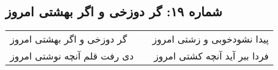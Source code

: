 \begin{center}
\section*{شماره ۱۹: گر دوزخی و اگر بهشتی امروز}
\label{sec:019}
\begin{longtable}{l p{0.5cm} r}
گر دوزخی و اگر بهشتی امروز
&&
پیدا نشودخوبی و زشتی امروز
\\
دی رفت قلم آنچه نوشتی امروز
&&
فردا ببر آید آنچه کشتی امروز
\\
\end{longtable}
\end{center}
